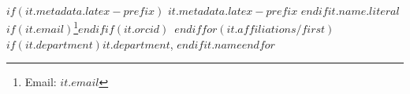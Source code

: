 $if(it.metadata.latex-prefix)$ $it.metadata.latex-prefix$ $endif$$it.name.literal$$if(it.email)$\footnote{Email: $it.email$}$endif$$if(it.orcid)$~$endif$$for(it.affiliations/first)$\\$if(it.department)${\footnotesize $it.department$}, $endif${\footnotesize $it.name$}$endfor$
